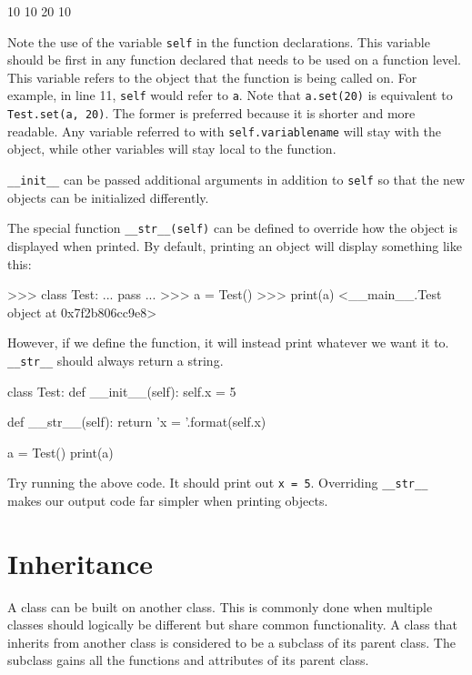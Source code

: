 \documentclass[11pt]{cselabheader}
\begin{document}
\begin{pyconcode}
10 10
20 10
\end{pyconcode}

Note the use of the variable \lstinline{self} in the function declarations.
This variable should be first in any function declared that needs to be used on
a function level. This variable refers to the object that the function is
being called on. For example, in line 11, \lstinline{self} would refer to
\lstinline{a}. Note that \lstinline{a.set(20)} is equivalent to
\lstinline{Test.set(a, 20)}. The former is preferred because it is shorter and
more readable. Any variable referred to with \lstinline{self.variablename} will
stay with the object, while other variables will stay local to the function.

\lstinline{__init__} can be passed additional arguments in addition to
\lstinline{self} so that the new objects can be initialized differently.

The special function \lstinline{__str__(self)} can be defined to override
how the object is displayed when printed. By default, printing an object will
display something like this:

\begin{pyconcode}
>>> class Test:
...     pass
... 
>>> a = Test()
>>> print(a)
<__main__.Test object at 0x7f2b806cc9e8>
\end{pyconcode}

However, if we define the function, it will instead print whatever we want it
to. \lstinline{__str__} should always return a string.

\begin{python3code}
class Test:
    def __init__(self):
        self.x = 5

    def __str__(self):
        return 'x = {}'.format(self.x)

a = Test()
print(a)
\end{python3code}

Try running the above code. It should print out \lstinline{x = 5}. Overriding
\lstinline{__str__} makes our output code far simpler when printing objects.

\section{Inheritance}
\label{sec:inheritance}
A class can be built on another class. This is commonly done when multiple
classes should logically be different but share common functionality. A class
that inherits from another class is considered to be a subclass of its parent
class. The subclass gains all the functions and attributes of its parent class.
\end{document}

